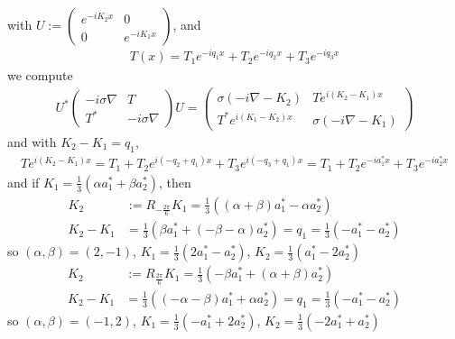 \documentclass[11pt,a4paper,reqno,french,tikz]{amsart}
\newcommand{\pa}[1]{\left( #1 \right)} %
\newcommand{\na}{\nabla} %
\newcommand{\f}[2]{\frac{#1}{#2}} %
\newcommand{\mat}[1]{\begin{pmatrix} #1 \end{pmatrix}} %
\begin{document}
with $U := \mat{e^{-iK_2 x} & 0 \\ 0 & e^{-iK_1 x}}$, and
\begin{align*}
T(x) = T_1 e^{-iq_1 x}  +T_2 e^{-iq_2 x}  +T_3 e^{-iq_3 x} 
\end{align*}
we compute
\begin{align}\label{eq:UmatU}
	U^* \mat{-i\sigma \na & T \\ T^* & -i\sigma \na} U = \mat{\sigma\pa{-i\na - K_2} & T e^{i\pa{K_2 - K_1}x} \\ T^* e^{i\pa{K_1-K_2}x} & \sigma\pa{-i\na - K_1}} 
\end{align}
and with $K_2 - K_1 = q_1$,
\begin{align*}
T e^{i\pa{K_2 - K_1}x} = T_1 + T_2 e^{i\pa{-q_2+q_1}x} + T_3 e^{i\pa{-q_3+q_1}x} = T_1 + T_2 e^{-i a_1^* x} + T_3 e^{-ia_2^* x}
\end{align*}
 and if $K_1 = \f 13 \pa{\alpha a_1^* + \beta a_2^*}$, then 
\begin{align*}
	K_2 &:= R_{-\f{2\pi}{6}} K_1 = \f 13 \pa{\pa{\alpha +\beta} a_1^* -\alpha a_2^*} \\
K_2 - K_1 &= \f 13 \pa{ \beta a_1^* + \pa{-\beta - \alpha} a_2^*} = q_1 = \f 13 \pa{-a_1^* - a_2 ^*}
\end{align*}
so $(\alpha,\beta) = (2,-1)$, $K_1 = \f 13 \pa{2a_1^* - a_2^*}$, $K_2 = \f 13 \pa{a_1^* - 2 a_2^*}$
\begin{align*}
	K_2 &:= R_{\f{2\pi}{6}} K_1 = \f 13 \pa{-\beta a_1^* + \pa{\alpha + \beta}a_2^*} \\
K_2 - K_1 &= \f 13 \pa{\pa{-\alpha -\beta}a_1^* + \alpha  a_2^*} = q_1 = \f 13 \pa{-a_1^* - a_2 ^*}
\end{align*}
so $(\alpha,\beta) = (-1,2)$, $K_1 = \f 13 \pa{-a_1^* + 2 a_2^*}$, $K_2 = \f 13 \pa{-2a_1^* + a_2^*}$




\end{document}
